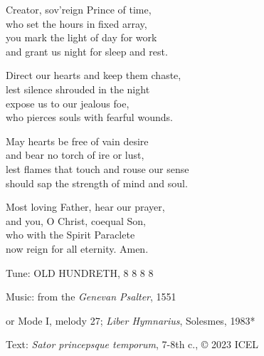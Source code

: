 \hymn

\begin{hymnverse}
Creator, sov’reign Prince of time,\\
who set the hours in fixed array,\\
you mark the light of day for work\\
and grant us night for sleep and rest.

Direct our hearts and keep them chaste,\\
lest silence shrouded in the night\\
expose us to our jealous foe,\\
who pierces souls with fearful wounds.

May hearts be free of vain desire\\
and bear no torch of ire or lust,\\
lest flames that touch and rouse our sense\\
should sap the strength of mind and soul.

Most loving Father, hear our prayer,\\
and you, O Christ, coequal Son,\\
who with the Spirit Paraclete\\
now reign for all eternity. Amen.
\end{hymnverse}

\begin{hymnsource}
Tune: OLD HUNDRETH, 8 8 8 8

Music: from the \emph{Genevan Psalter}, 1551

or Mode I, melody 27; \emph{Liber Hymnarius}, Solesmes, 1983*

Text: \emph{Sator princepsque temporum}, 7-8th c., © 2023 ICEL
\end{hymnsource}